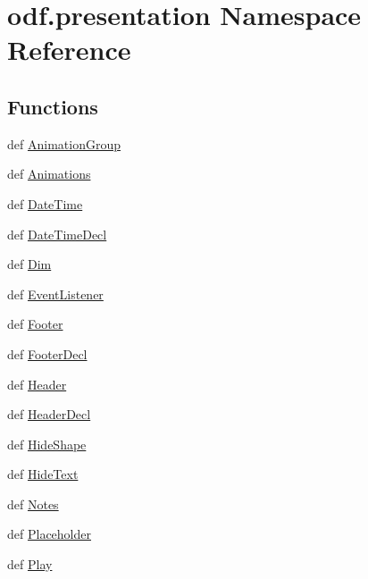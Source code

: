 \hypertarget{namespaceodf_1_1presentation}{\section{odf.\+presentation Namespace Reference}
\label{namespaceodf_1_1presentation}
}
\subsection*{Functions}
\begin{DoxyCompactItemize}
\item 
def \hyperlink{namespaceodf_1_1presentation_a5ab8f355021eafa308c0c61148fb97dc}{Animation\+Group}
\item 
def \hyperlink{namespaceodf_1_1presentation_a6e766c72aac1ec2e1204539a6209eb32}{Animations}
\item 
def \hyperlink{namespaceodf_1_1presentation_a306ee731e45c82ea8196564fbf25b65d}{Date\+Time}
\item 
def \hyperlink{namespaceodf_1_1presentation_a2f5ab7601a332b6a726597faf6ce29ac}{Date\+Time\+Decl}
\item 
def \hyperlink{namespaceodf_1_1presentation_abec59f30e68813be509ff7958f40bc25}{Dim}
\item 
def \hyperlink{namespaceodf_1_1presentation_a10a873f25e671d856844e6324d76b9c5}{Event\+Listener}
\item 
def \hyperlink{namespaceodf_1_1presentation_a34dc6d4fae71a268b8ae1c6c93a1604a}{Footer}
\item 
def \hyperlink{namespaceodf_1_1presentation_ad64dd8b08b5c28815d567a8b5442a0a0}{Footer\+Decl}
\item 
def \hyperlink{namespaceodf_1_1presentation_a570922e6a160afbe90db899357860e99}{Header}
\item 
def \hyperlink{namespaceodf_1_1presentation_aa96209c8fdb02a4bedcb19ef5733981e}{Header\+Decl}
\item 
def \hyperlink{namespaceodf_1_1presentation_a79c781696d5dc84d5b59bdd29ab06e29}{Hide\+Shape}
\item 
def \hyperlink{namespaceodf_1_1presentation_af9f43b5a546d5119f82f99ceec07b8a9}{Hide\+Text}
\item 
def \hyperlink{namespaceodf_1_1presentation_a5c91562888ed717a8b6825e539282da9}{Notes}
\item 
def \hyperlink{namespaceodf_1_1presentation_a42f23ec52c296e37bf900a175e21a04e}{Placeholder}
\item 
def \hyperlink{namespaceodf_1_1presentation_ab876940af857190232d52ff52d89e264}{Play}

\end{DoxyCompactItemize}
